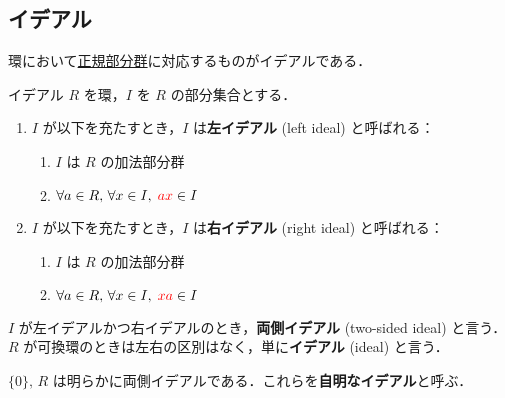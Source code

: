 \documentclass[geometry_main]{subfiles}
\begin{document}
\subsection{イデアル}

環において\hyperref[def.subgroup_normal]{正規部分群}に対応するものがイデアルである．

\begin{mydef}[label=def:ideal]{イデアル}
	$R$ を環，$I$ を $R$ の部分集合とする． 
	\begin{enumerate}
		\item $I$ が以下を充たすとき，$I$ は\textbf{左イデアル} (left ideal) と呼ばれる：
		\begin{enumerate}
			\item $I$ は $R$ の加法部分群
			\item $\forall a \in R,\, \forall x \in I,\; \textcolor{red}{ax} \in I$
		\end{enumerate}
		\item $I$ が以下を充たすとき，$I$ は\textbf{右イデアル} (right ideal) と呼ばれる：
		\begin{enumerate}
			\item $I$ は $R$ の加法部分群
			\item $\forall a \in R,\, \forall x \in I,\; \textcolor{red}{xa} \in I$
		\end{enumerate}
	\end{enumerate}
	$I$ が左イデアルかつ右イデアルのとき，\textbf{両側イデアル} (two-sided ideal) と言う． 
	$R$ が可換環のときは左右の区別はなく，単に\textbf{イデアル} (ideal) と言う．
\end{mydef}

$\{0\},\, R$ は明らかに両側イデアルである．これらを\textbf{自明なイデアル}と呼ぶ．
\end{document}
